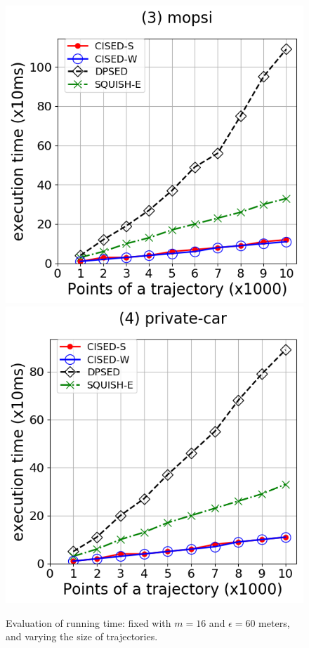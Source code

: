 \begin{figure}[tb!]
\includegraphics[scale = 0.275]{Figures/Exp-time-size-mopsi.png}\hspace{3ex}
\includegraphics[scale = 0.275]{Figures/Exp-time-size-private.png}
\caption{\small Evaluation of running time: fixed with $m=16$ and $\epsilon=60$ meters, and varying the size of trajectories. }
\label{fig:time-size}
\vspace{-2ex}
\end{figure}







